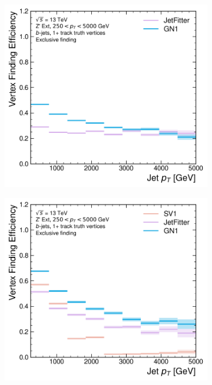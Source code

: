 \begin{figure}[!htbp]
    \centering
    \begin{subfigure}[b]{0.48\textwidth}
        \centering
        \includegraphics[width=\textwidth]{chapters/gnn_tagger/figs/results/tracks/zprime/zprime_bjet_vert_eff_1+_track_excl.pdf}
    \end{subfigure}
    \quad
    \begin{subfigure}[b]{0.48\textwidth}
        \centering
        \includegraphics[width=\textwidth]{chapters/gnn_tagger/figs/results/tracks/zprime/zprime_bjet_vert_eff_2+_track_incl.pdf}

\end{subfigure}
\end{figure}
